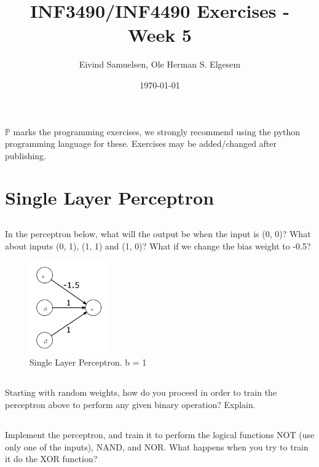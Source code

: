 \documentclass{article}           %
\title{\vspace{-2cm}INF3490/INF4490 Exercises - Week 5}
\author{Eivind Samuelsen, Ole Herman S. Elgesem}
\date{\today}
\newcommand\marginsymbol[1][0pt]{%
  \tabto*{0cm}\makebox[\dimexpr-1cm-#1\relax][r]{$\mathbb{P}$}\tabto*{\TabPrevPos}}
\begin{document}
    \renewcommand\marginsymbol[1][0pt]{%
  \tabto*{0cm}\makebox[-1cm][c]{$\mathbb{P}$}\tabto*{\TabPrevPos}}

\maketitle
\(\mathbb{P}\) marks the programming exercises, we strongly recommend using
the python programming language for these. Exercises may be added/changed
after publishing.

\section{Single Layer Perceptron}
\subsection{}
In the perceptron below, what will the output be when the input is (0, 0)?
What about inputs (0, 1), (1, 1) and (1, 0)?
What if we change the bias weight to -0.5?

\begin{figure}[H]
\begin{center}
\includegraphics[width=0.3\textwidth]{fig1.png}
\caption{Single Layer Perceptron. b = 1 }
\label{fig:slp}
\end{center}
\end{figure}

\subsection{}
Starting with random weights, how do you proceed in order to train the
perceptron above to perform any given binary operation? Explain.
\subsection{\marginsymbol}
Implement the perceptron, and train it to perform the logical functions NOT
(use only one of the inputs), NAND, and NOR. What happens when you try to
train it do the XOR function?
\end{document}
